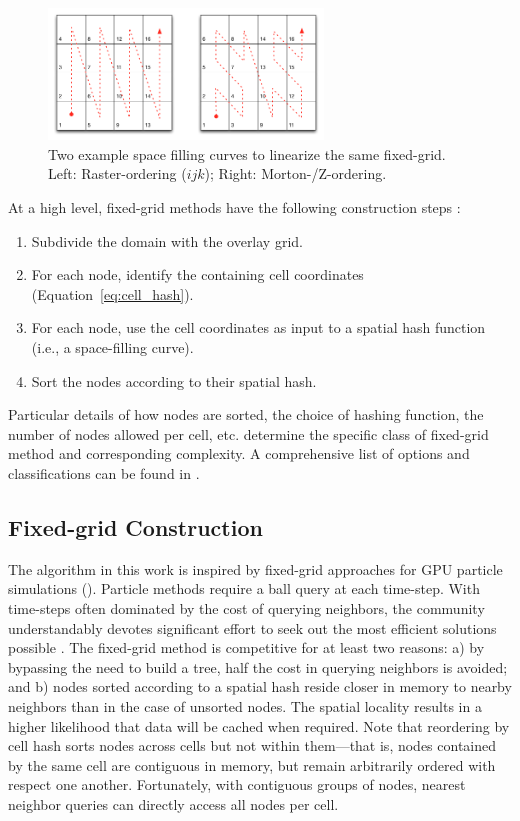 \documentclass{report}
\begin{document}
\begin{figure}
\centering
\includegraphics[width=0.65\textwidth]{rbffd_methods_content/neighbors/space_filling_curves.png}
\caption{Two example space filling curves to linearize the same fixed-grid. Left: Raster-ordering ($ijk$); Right: Morton-/Z-ordering.}
\label{fig:space_filling_curves}
\end{figure} 


At a high level, fixed-grid methods have the following construction steps \cite{Krog2010}:
\begin{enumerate}
\item Subdivide the domain with the overlay grid.
\item For each node, identify the containing cell coordinates (Equation~\ref{eq:cell_hash}).
\item For each node, use the cell coordinates as input to a spatial hash function (i.e., a space-filling curve).
\item Sort the nodes according to their spatial hash.
\end{enumerate}
Particular details of how nodes are sorted, the choice of hashing function, the number of nodes allowed per cell, etc. determine the specific class of fixed-grid method and corresponding complexity. A comprehensive list of options and classifications can be found in \cite{Samet2005}. 

\subsection{Fixed-grid Construction}
The algorithm in this work is inspired by fixed-grid approaches for GPU particle simulations (\cite{Krog2010,Green2010,Johnson2011}). Particle methods require a ball query at each time-step. With time-steps often dominated by the cost of querying neighbors, the community understandably devotes significant effort to seek out the most efficient solutions possible \cite{Goswami2010}. The fixed-grid method is competitive for at least two reasons: a) by bypassing the need to build a tree, half the cost in querying neighbors is avoided; and b) nodes sorted according to a spatial hash reside closer in memory to nearby neighbors than in the case of unsorted nodes. The spatial locality results in a higher likelihood that data will be cached when required. Note that reordering by cell hash sorts nodes across cells but not within them---that is, nodes contained by the same cell are contiguous in memory, but remain arbitrarily ordered with respect one another. Fortunately, with contiguous groups of nodes, nearest neighbor queries can directly access all nodes per cell. 
\end{document}
